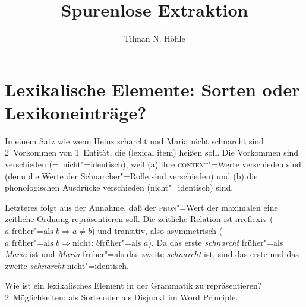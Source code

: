 \documentclass[output=paper]{LSP/langsci}
\author{Tilman N. Höhle}
\title{Spurenlose Extraktion}
\begin{document}
\label{chap-spurenlose-extraktion}
\setcounter{randcount}{0}

\renewcommand*{\thefootnote}{\fnsymbol{footnote}}
\setcounter{footnote}{4}

\renewcommand*{\thefootnote}{\arabic{footnote}}
\setcounter{footnote}{0}

\section{Lexikalische Elemente: Sorten oder Lexikoneinträge?}

\randnum\label{rn:17-1}In einem Satz wie {\glqq}wenn Heinz scharcht und Maria nicht schnarcht{\grqq} sind
2~Vorkommen von 1~Entität, die  (lexical item)
heißen soll. Die Vorkommen sind verschieden (=~nicht"=identisch), weil
(a) ihre \textsc{content}"=Werte verschieden sind (denn die Werte der
Schnarcher"=Rolle sind verschieden) und (b) die phonologischen
Ausdrücke verschieden (nicht"=identisch) sind.

\randnum\label{rn:17-2}Letzteres folgt aus der Annahme, daß der \textsc{phon}"=Wert
der maximalen  eine zeitliche Ordnung repräsentieren
soll. Die zeitliche Relation  ist irreflexiv
($a \text{ früher"=als } b \Rightarrow a \neq b$) und transitiv, also
asymmetrisch
($a \text{ früher"=als } b \Rightarrow \text{nicht: } b \text{
  früher"=als } a$). Da das erste \textit{schnarcht} früher"=als \textit{Maria} ist und
\textit{Maria} früher"=als das zweite \textit{schnarcht} ist, sind das erste und das
zweite \textit{schnarcht} nicht"=identisch.

{\randnum}Wie ist ein lexikalisches Element in der
Grammatik zu repräsentieren?  2~Möglichkeiten: als Sorte oder als
Disjunkt im Word Principle.

\end{document}

